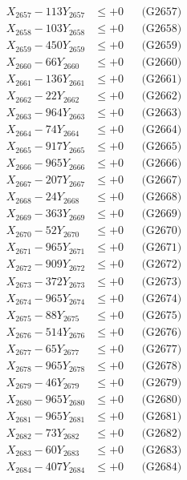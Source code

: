 \documentclass[a4paper,10pt]{article}
\begin{document}
{\begin{align}
X_{2657} - 113Y_{2657} &\leq +0 && \text{(G2657)} \\
X_{2658} - 103Y_{2658} &\leq +0 && \text{(G2658)} \\
X_{2659} - 450Y_{2659} &\leq +0 && \text{(G2659)} \\
X_{2660} - 66Y_{2660} &\leq +0 && \text{(G2660)} \\
\allowbreak
X_{2661} - 136Y_{2661} &\leq +0 && \text{(G2661)} \\
X_{2662} - 22Y_{2662} &\leq +0 && \text{(G2662)} \\
X_{2663} - 964Y_{2663} &\leq +0 && \text{(G2663)} \\
X_{2664} - 74Y_{2664} &\leq +0 && \text{(G2664)} \\
X_{2665} - 917Y_{2665} &\leq +0 && \text{(G2665)} \\
X_{2666} - 965Y_{2666} &\leq +0 && \text{(G2666)} \\
X_{2667} - 207Y_{2667} &\leq +0 && \text{(G2667)} \\
X_{2668} - 24Y_{2668} &\leq +0 && \text{(G2668)} \\
X_{2669} - 363Y_{2669} &\leq +0 && \text{(G2669)} \\
X_{2670} - 52Y_{2670} &\leq +0 && \text{(G2670)} \\
\allowbreak
X_{2671} - 965Y_{2671} &\leq +0 && \text{(G2671)} \\
X_{2672} - 909Y_{2672} &\leq +0 && \text{(G2672)} \\
X_{2673} - 372Y_{2673} &\leq +0 && \text{(G2673)} \\
X_{2674} - 965Y_{2674} &\leq +0 && \text{(G2674)} \\
X_{2675} - 88Y_{2675} &\leq +0 && \text{(G2675)} \\
X_{2676} - 514Y_{2676} &\leq +0 && \text{(G2676)} \\
X_{2677} - 65Y_{2677} &\leq +0 && \text{(G2677)} \\
X_{2678} - 965Y_{2678} &\leq +0 && \text{(G2678)} \\
X_{2679} - 46Y_{2679} &\leq +0 && \text{(G2679)} \\
X_{2680} - 965Y_{2680} &\leq +0 && \text{(G2680)} \\
\allowbreak
X_{2681} - 965Y_{2681} &\leq +0 && \text{(G2681)} \\
X_{2682} - 73Y_{2682} &\leq +0 && \text{(G2682)} \\
X_{2683} - 60Y_{2683} &\leq +0 && \text{(G2683)} \\
X_{2684} - 407Y_{2684} &\leq +0 && \text{(G2684)} \\

\end{align}}
\end{document}
